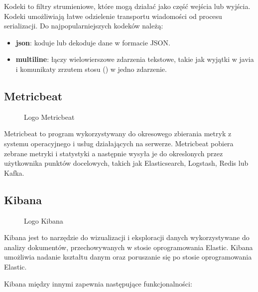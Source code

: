 Kodeki to filtry strumieniowe, które mogą działać jako część wejścia lub wyjścia. Kodeki umożliwiają łatwe odzielenie transportu wiadomości od procesu serializacji. Do najpopularniejszych kodeków należą:

\begin{itemize}
    \item \textbf{json}: koduje lub dekoduje dane w formacie JSON\cite{logstashManualHowItWorks}.
    \item \textbf{multiline}: łączy wielowierszowe zdarzenia tekstowe, takie jak wyjątki w javia i komunikaty zrzutem stosu () w jedno zdarzenie\cite{logstashManualHowItWorks}.
\end{itemize}


\subsection{ Metricbeat }

\begin{figure}[!htbp]
    \centering
    
    \caption{Logo Metricbeat\cite{metricbeatLogo}}
    \label{fig:enter-label}
\end{figure}

Metricbeat to program wykorzystywany do okresowego zbierania metryk z systemu operacyjnego i usług działających na serwerze. Metricbeat pobiera zebrane metryki i statystyki a następnie wysyła je do okreslonych przez użytkownika punktów docelowych, takich jak Elasticsearch, Logstash, Redis lub Kafka\cite{metricbeatOverview}.


\subsection{ Kibana }

\begin{figure}[!htbp]
    \centering
    
    \caption{Logo Kibana\cite{kibanaLogo}}
    \label{fig:enter-label}
\end{figure}

Kibana jest to narzędzie do wizualizacji i eksploracji danych wykorzystywane do analizy dokumentów, przechowywanych w stosie oprogramowania Elastic. Kibana umożliwia nadanie kształtu danym oraz poruszanie się po stosie oprogramowania Elastic\cite{kibanaOverview}. 

Kibana między innymi zapewnia następujące funkcjonalności:

